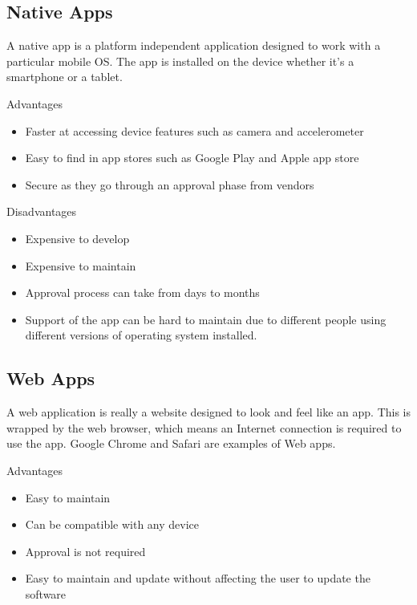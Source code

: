 \subsection{Native Apps}

A native app is a platform independent application designed to work with a particular mobile OS. The app is installed on the device whether it’s a smartphone or a tablet.

Advantages

\begin{itemize}
    \item Faster at accessing device features such as camera and accelerometer
    \item Easy to find in app stores such as Google Play and Apple app store
    \item Secure as they go through an approval phase from vendors 
\end{itemize}


Disadvantages

\begin{itemize}
    \item Expensive to develop 
    \item Expensive to maintain 
    \item Approval process can take from days to months
    \item Support of the app can be hard to maintain due to different people using different versions of operating system installed.
\end{itemize}

\subsection{Web Apps}

A web application is really a website designed to look and feel like an app. This is wrapped by the web browser, which means an Internet connection is required to use the app. Google Chrome and Safari are examples of Web apps. 

Advantages

\begin{itemize}
    \item Easy to maintain 
    \item Can be compatible with any device 
    \item Approval is not required
    \item Easy to maintain and update without affecting the user to update the software 
\end{itemize}

